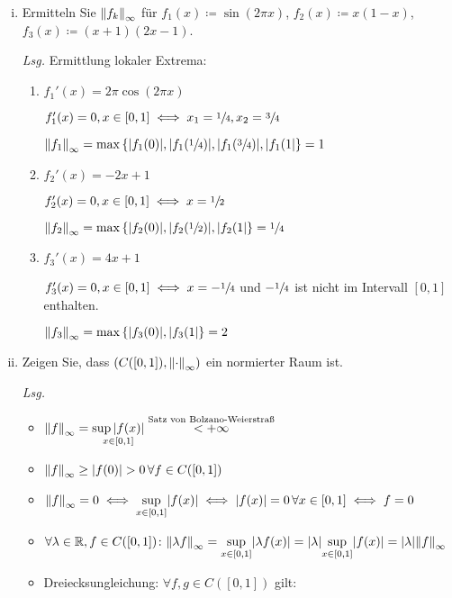 \documentclass{article}
\begin{document}
\begin{enumerate}[(i)]
\item Ermitteln Sie $\norm{f_k}_{\infty}$ für $f_1(x) \coloneqq \sin(2\pi x)$,
  $f_2(x) \coloneqq x(1 - x)$, $f_3(x) \coloneqq (x + 1)(2x - 1)$.

  \textit{Lsg.} Ermittlung lokaler Extrema:
  \begin{enumerate}[1)]
  \item $f_1'(x) = 2 \pi \cos(2\pi x)$

    $f_1'(x) = 0, x \in [0, 1] \iff x_1 = \sfrac{1}{4}, x_2 = \sfrac{3}{4}$

    $\norm{f_1}_{\infty} = \max\qty{\abs{f_1(0)}, \abs{f_1(\sfrac{1}{4})}, \abs{f_1(\sfrac{3}{4})}, \abs{f_1(1}} = 1$

  \item $f_2'(x) = -2x + 1$

    $f_2'(x) = 0, x \in [0, 1] \iff x = \sfrac{1}{2}$

    $\norm{f_2}_{\infty} = \max\qty{\abs{f_2(0)}, \abs{f_2(\sfrac{1}{2})}, \abs{f_2(1}} = \sfrac{1}{4}$

  \item $f_3'(x) = 4x + 1$

    $f_3'(x) = 0, x \in [0, 1] \iff x = -\sfrac{1}{4}$ und $-\sfrac{1}{4}$ ist nicht im Intervall $[0, 1]$ enthalten.

    $\norm{f_3}_{\infty} = \max\qty{\abs{f_3(0)}, \abs{f_3(1}} = 2$
  \end{enumerate}

\newpage
\item Zeigen Sie, dass $(C([0, 1]), \norm{\cdot}_{\infty})$ ein normierter Raum ist.

  \textit{Lsg.}
  \begin{itemize}
  \item $\norm{f}_{\infty} = \underset{x \in [0, 1]}{\sup \abs{f(x)}}
    \overset{\text{Satz von Bolzano-Weierstraß}}{< +\infty}$
  \item $\norm{f}_{\infty} \geq \abs{f(0)} > 0 \,\forall f \in C([0, 1])$
  \item $\norm{f}_{\infty} = 0 \iff \underset{x \in [0, 1]}{\sup} \abs{f(x)} \iff \abs{f(x)} = 0
    \,\forall x \in [0, 1] \iff f = 0$
  \item $\forall \lambda \in \mathbb{R}, f \in C([0, 1]) \colon
    \norm{\lambda f}_{\infty} = \underset{x \in [0, 1]}{\sup} \abs{\lambda f(x)}
    = \abs{\lambda} \underset{x \in [0, 1]}{\sup} \abs{f(x)} = \abs{\lambda} \norm{f}_{\infty}$
  \item Dreiecksungleichung: $\forall f, g \in C([0, 1])$ gilt:


\end{itemize}
\end{enumerate}
\end{document}
